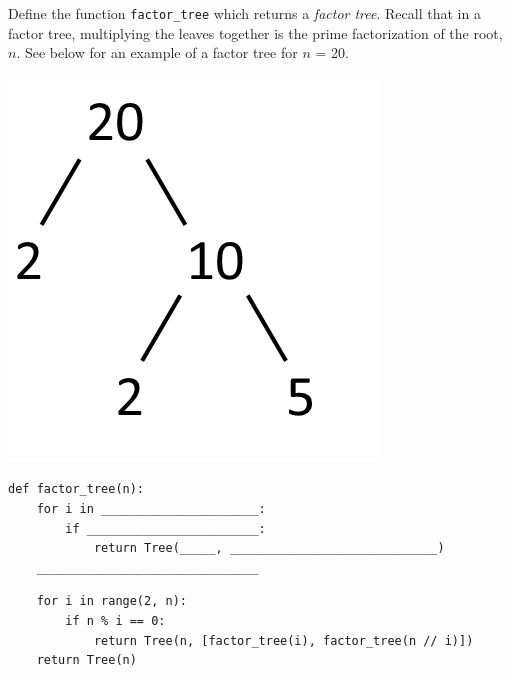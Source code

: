 \begin{blocksection}
\question Define the function \lstinline$factor_tree$ which returns a \emph{factor tree}. Recall that in a factor tree, multiplying the leaves together is the prime factorization of the root, $n$. See below for an example of a factor tree for $n$ = 20.\\

\begin{center}
\includegraphics[scale=0.3]{factor_tree_20.png}
\end{center}

\vspace{2\baselineskip}
\begin{lstlisting}
def factor_tree(n):
    for i in ______________________:
        if ________________________:
            return Tree(_____, _____________________________)
    _______________________________
\end{lstlisting}

\begin{solution}[0.5in]
\begin{lstlisting}
    for i in range(2, n):
        if n % i == 0:
            return Tree(n, [factor_tree(i), factor_tree(n // i)])
    return Tree(n)
\end{lstlisting}
\end{solution}
\end{blocksection}
